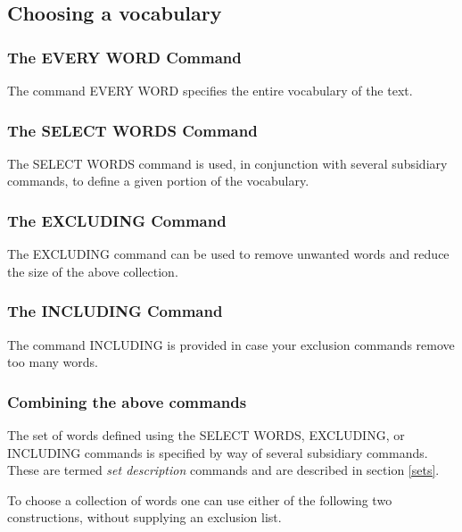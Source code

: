 \subsection{Choosing a vocabulary}
\subsubsection{The EVERY WORD Command}
    The command EVERY WORD specifies the entire vocabulary of the text.
\subsubsection{The SELECT WORDS Command}
    The SELECT WORDS command is used, in conjunction with
    several subsidiary commands, to define a given portion of the vocabulary.
\subsubsection{The EXCLUDING Command}
    The EXCLUDING command can be used to remove
    unwanted words and reduce the size of the above collection.
\subsubsection{The INCLUDING Command}
    The  command INCLUDING is provided in case your exclusion
    commands remove too many words.

\subsubsection{Combining the above commands}
The set of words defined using the SELECT WORDS, EXCLUDING, or INCLUDING
commands is specified by way of several subsidiary commands.  These
are termed {\em set description} commands and are described in
section \ref{sets}.

To choose a collection of words one can use either of the following
two constructions, without supplying an exclusion list.

